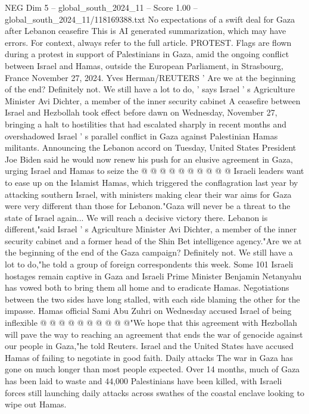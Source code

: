 \begin{textsample}{NEG Dim 5 – global\_south\_2024\_11 – Score 1.00 – global\_south\_2024\_11/118169388.txt}  \label{ex:f5_neg_433}
No expectations of a swift deal for Gaza after Lebanon ceasefire This is AI generated summarization, which may have errors.
For context, always refer to the full article.
PROTEST.
Flags are flown during a protest in support of Palestinians in Gaza, amid the ongoing conflict between Israel and Hamas, outside the European Parliament, in Strasbourg, France November 27, 2024.
Yves Herman/REUTERS ' Are we at the beginning of the end?
Definitely not.
We still have a lot to do, ' says Israel ' s Agriculture Minister Avi Dichter, a member of the inner security cabinet A ceasefire between Israel and Hezbollah took effect before dawn on Wednesday, November 27, bringing a halt to hostilities that had escalated sharply in recent months and overshadowed Israel ' s parallel conflict in Gaza against Palestinian Hamas militants.
Announcing the Lebanon accord on Tuesday, United States President Joe Biden said he would now renew his push for an elusive agreement in Gaza, urging Israel and Hamas to seize the @ @ @ @ @ @ @ @ @ @ Israeli leaders want to ease up on the Islamist Hamas, which triggered the conflagration last year by attacking southern Israel, with ministers making clear their war aims for Gaza were very different than those for Lebanon."Gaza will never be a threat to the state of Israel again...
We will reach a decisive victory there.
Lebanon is different,"said Israel ' s Agriculture Minister Avi Dichter, a member of the inner security cabinet and a former head of the Shin Bet intelligence agency."Are we at the beginning of the end of the Gaza campaign?
Definitely not.
We still have a lot to do,"he told a group of foreign correspondents this week.
Some 101 Israeli hostages remain captive in Gaza and Israeli Prime Minister Benjamin Netanyahu has vowed both to bring them all home and to eradicate Hamas.
Negotiations between the two sides have long stalled, with each side blaming the other for the impasse.
Hamas official Sami Abu Zuhri on Wednesday accused Israel of being inflexible @ @ @ @ @ @ @ @ @ @"We hope that this agreement with Hezbollah will pave the way to reaching an agreement that ends the war of genocide against our people in Gaza,"he told Reuters.
Israel and the United States have accused Hamas of failing to negotiate in good faith.
Daily attacks The war in Gaza has gone on much longer than most people expected.
Over 14 months, much of Gaza has been laid to waste and 44,000 Palestinians have been killed, with Israeli forces still launching daily attacks across swathes of the coastal enclave looking to wipe out Hamas.

\end{textsample}
